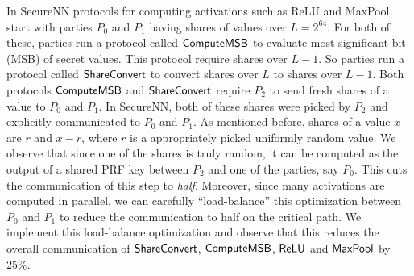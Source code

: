 In SecureNN protocols for computing activations such as ReLU and MaxPool start with parties $P_0$ and $P_1$ having shares of values over $L = 2^{64}$. 
For both of these, parties run a protocol called $\mathsf{ComputeMSB}$ to evaluate most significant bit (MSB) of secret values. This protocol require shares over $L-1$. So parties run a protocol called $\mathsf{ShareConvert}$ to convert shares over $L$ to shares over $L-1$. Both protocols $\mathsf{ComputeMSB}$ and $\mathsf{ShareConvert}$ require $P_2$ to send fresh shares of a value to $P_0$ and $P_1$. In SecureNN, both of these shares were picked by $P_2$ and explicitly communicated to $P_0$ and $P_1$.  As mentioned before, shares of a value $x$ are $r$ and $x - r$, where $r$ is a appropriately picked uniformly random value. We observe that since one of the shares is truly random, it can be computed as the output of a shared PRF key between $P_2$ and one of the parties, say $P_0$. This cuts the communication of this step to {\em half}. Moreover, since many activations are computed in parallel, we can carefully ``load-balance'' this optimization between $P_0$ and $P_1$ to reduce the communication to half on the critical path. We implement this load-balance optimization and observe that this reduces the overall communication of $\mathsf{ShareConvert}$, $\mathsf{ComputeMSB}$, $\mathsf{ReLU}$ and $\mathsf{MaxPool}$ by $25\%$. 


